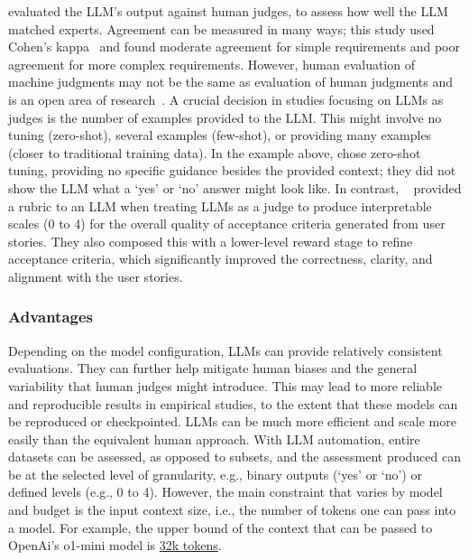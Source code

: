 \citeauthor{DBLP:conf/re/LubosFTGMEL24} evaluated the LLM's output against human judges, to assess how well the LLM matched experts. 
Agreement can be measured in many ways; this study used Cohen's kappa~\cite{cohen60} and found moderate agreement for simple requirements and poor agreement for more complex requirements.
However, human evaluation of machine judgments may not be the same as evaluation of human judgments and is an open area of research~\cite{DBLP:journals/corr/abs-2410-03775}. 
A crucial decision in studies focusing on LLMs as judges is the number of examples provided to the LLM.
This might involve no tuning (zero-shot), several examples (few-shot), or providing many examples (closer to traditional training data).
In the example above, \citeauthor{DBLP:conf/re/LubosFTGMEL24} chose zero-shot tuning, providing no specific guidance besides the provided context; they did not show the LLM what a `yes' or `no' answer might look like. 
In contrast, \citeauthor{wang2025multimodalrequirementsdatabasedacceptance}~\cite{wang2025multimodalrequirementsdatabasedacceptance} provided a rubric to an LLM when treating LLMs as a judge to produce interpretable scales (0 to 4) for the overall quality of acceptance criteria generated from user stories.
They also composed this with a lower-level reward stage to refine acceptance criteria, which significantly improved the correctness, clarity, and alignment with the user stories.

\subsubsection{Advantages}

Depending on the model configuration, LLMs can provide relatively consistent evaluations.
They can further help mitigate human biases and the general variability that human judges might introduce.
This may lead to more reliable and reproducible results in empirical studies, to the extent that these models can be reproduced or checkpointed.
LLMs can be much more efficient and scale more easily than the equivalent human approach.
With LLM automation, entire datasets can be assessed, as opposed to subsets, and the assessment produced can be at the selected level of granularity, e.g., binary outputs (`yes' or `no') or defined levels (e.g., 0 to 4).
However, the main constraint that varies by model and budget is the input context size, i.e., the number of tokens one can pass into a model.
For example, the upper bound of the context that can be passed to OpenAi's \textsf{o1-mini} model is \href{https://help.openai.com/en/articles/9855712-openai-o1-models-faq-chatgpt-enterprise-and-edu}{32k tokens}.

